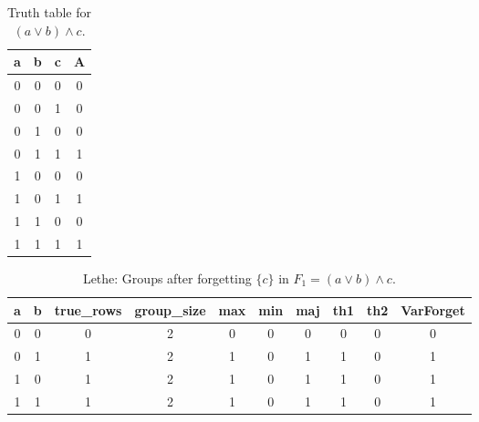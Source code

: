 \begin{table}[!tb]
    \centering
    \begin{tabular}{|c|c|c|c|}
        \hline
        \textbf{a} & \textbf{b} & \textbf{c} & \textbf{A} \\ \hline
        0 & 0 & 0 & 0 \\ \hline
        0 & 0 & 1 & 0 \\ \hline
        0 & 1 & 0 & 0 \\ \hline
        0 & 1 & 1 & 1 \\ \hline
        1 & 0 & 0 & 0 \\ \hline
        1 & 0 & 1 & 1 \\ \hline
        1 & 1 & 0 & 0 \\ \hline
        1 & 1 & 1 & 1 \\ \hline
    \end{tabular}
    \caption{Truth table for $(a \lor b) \land c$.}
    \label{tab:truthtab}
\end{table}

\begin{table}[!tb]
    \centering
    \begin{tabular}{|c|c|c|c|c|c|c|c|c|c|}
        \hline
        \textbf{a} & \textbf{b} & \textbf{true\_rows} & \textbf{group\_size} & \textbf{max} & \textbf{min} & \textbf{maj} & \textbf{th1} & \textbf{th2} & \textbf{VarForget} \\ \hline
        \rowcolor{gray!40} 0 & 0 & 0 & 2 & 0 & 0 & 0 & 0 & 0 & 0 \\ \hline
        \rowcolor{blue!40} 0 & 1 & 1 & 2 & 1 & 0 & 1 & 1 & 0 & 1 \\ \hline
        \rowcolor{red!40} 1 & 0 & 1 & 2 & 1 & 0 & 1 & 1 & 0 & 1 \\ \hline
        \rowcolor{green!40} 1 & 1 & 1 & 2 & 1 & 0 & 1 & 1 & 0 & 1 \\ \hline
    \end{tabular}
    \caption{Lethe: Groups after forgetting $\{c\}$ in $F_{1} = (a \lor b) \land c$.}
    \label{tab:lethe-F1-c-groups}
\end{table}
